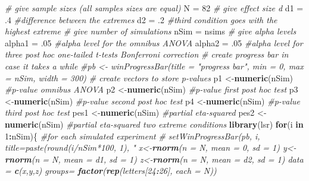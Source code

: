 \documentclass[]{book}
\newenvironment{Shaded}{\begin{snugshade}}{\end{snugshade}}
\newcommand{\CommentTok}[1]{\textcolor[rgb]{0.56,0.35,0.01}{\textit{#1}}}
\newcommand{\ControlFlowTok}[1]{\textcolor[rgb]{0.13,0.29,0.53}{\textbf{#1}}}
\newcommand{\DataTypeTok}[1]{\textcolor[rgb]{0.13,0.29,0.53}{#1}}
\newcommand{\DecValTok}[1]{\textcolor[rgb]{0.00,0.00,0.81}{#1}}
\newcommand{\FloatTok}[1]{\textcolor[rgb]{0.00,0.00,0.81}{#1}}
\newcommand{\KeywordTok}[1]{\textcolor[rgb]{0.13,0.29,0.53}{\textbf{#1}}}
\newcommand{\NormalTok}[1]{#1}
\newcommand{\OperatorTok}[1]{\textcolor[rgb]{0.81,0.36,0.00}{\textbf{#1}}}
\newcommand{\StringTok}[1]{\textcolor[rgb]{0.31,0.60,0.02}{#1}}
\begin{document}
\begin{Shaded}
\begin{Highlighting}[]
\CommentTok{# give sample sizes (all samples sizes are equal)}
\NormalTok{N =}\StringTok{ }\DecValTok{82}
\CommentTok{# give effect size d}
\NormalTok{d1 =}\StringTok{ }\FloatTok{.4} \CommentTok{#difference between the extremes}
\NormalTok{d2 =}\StringTok{ }\FloatTok{.2} \CommentTok{#third condition goes with the highest extreme}
\CommentTok{# give number of simulations}
\NormalTok{nSim =}\StringTok{ }\NormalTok{nsims}
\CommentTok{# give alpha levels}
\NormalTok{alpha1 =}\StringTok{ }\FloatTok{.05} \CommentTok{#alpha level for the omnibus ANOVA}
\NormalTok{alpha2 =}\StringTok{ }\FloatTok{.05} \CommentTok{#alpha level for three post hoc one-tailed t-tests Bonferroni correction}
\CommentTok{# create progress bar in case it takes a while}
\CommentTok{#pb <- winProgressBar(title = "progress bar", min = 0, max = nSim, width = 300)}
\CommentTok{# create vectors to store p-values}
\NormalTok{p1 <-}\KeywordTok{numeric}\NormalTok{(nSim) }\CommentTok{#p-value omnibus ANOVA}
\NormalTok{p2 <-}\KeywordTok{numeric}\NormalTok{(nSim) }\CommentTok{#p-value first post hoc test}
\NormalTok{p3 <-}\KeywordTok{numeric}\NormalTok{(nSim) }\CommentTok{#p-value second post hoc test}
\NormalTok{p4 <-}\KeywordTok{numeric}\NormalTok{(nSim) }\CommentTok{#p-value third post hoc test}
\NormalTok{pes1 <-}\KeywordTok{numeric}\NormalTok{(nSim) }\CommentTok{#partial eta-squared}
\NormalTok{pes2 <-}\KeywordTok{numeric}\NormalTok{(nSim) }\CommentTok{#partial eta-squared two extreme conditions}
\KeywordTok{library}\NormalTok{(lsr)}
\ControlFlowTok{for}\NormalTok{(i }\ControlFlowTok{in} \DecValTok{1}\OperatorTok{:}\NormalTok{nSim)\{ }\CommentTok{#for each simulated experiment}
 \CommentTok{# setWinProgressBar(pb, i, title=paste(round(i/nSim*100, 1), "%
\NormalTok{  x<-}\KeywordTok{rnorm}\NormalTok{(}\DataTypeTok{n =}\NormalTok{ N, }\DataTypeTok{mean =} \DecValTok{0}\NormalTok{, }\DataTypeTok{sd =} \DecValTok{1}\NormalTok{)}
\NormalTok{  y<-}\KeywordTok{rnorm}\NormalTok{(}\DataTypeTok{n =}\NormalTok{ N, }\DataTypeTok{mean =}\NormalTok{ d1, }\DataTypeTok{sd =} \DecValTok{1}\NormalTok{) }
\NormalTok{  z<-}\KeywordTok{rnorm}\NormalTok{(}\DataTypeTok{n =}\NormalTok{ N, }\DataTypeTok{mean =}\NormalTok{ d2, }\DataTypeTok{sd =} \DecValTok{1}\NormalTok{) }
\NormalTok{  data =}\StringTok{ }\KeywordTok{c}\NormalTok{(x,y,z)}
\NormalTok{  groups=}\StringTok{ }\KeywordTok{factor}\NormalTok{(}\KeywordTok{rep}\NormalTok{(letters[}\DecValTok{24}\OperatorTok{:}\DecValTok{26}\NormalTok{], }\DataTypeTok{each =}\NormalTok{ N))}
}
\end{Highlighting}
\end{Shaded}
\end{document}
